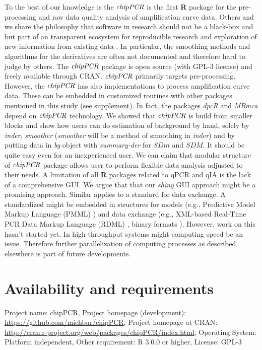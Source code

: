 \documentclass[twocolumn]{bmcart}%
\begin{document}
To the best of our knowledge is the $\emph{chipPCR}$ is the first \textbf{R} 
package for the pre-processing and raw data quality analysis of amplification 
curve data. Others and we share the philosophy that software in research should 
not be a black-box and but part of an transparent ecosystem for reproducible 
research and exploration of new information from existing data 
\cite{Thioulouse_2010, roediger_RJ_2013, hofmann_2013, Leeper_2014, liu_2014}. 
In particular, the smoothing methods and algorithms for the derivatives are 
often not documented and therefore hard to judge by others. The $\emph{chipPCR}$ 
package is open source (with GPL-3 license) and freely available through CRAN. 
$\emph{chipPCR}$ primarily targets pre-processing. However, the $\emph{chipPCR}$ 
has also implementations to process amplification curve data. These can be 
embedded in customized routines with other packages mentioned in this study 
(see supplement). In fact, the packages \emph{dpcR} and \emph{MBmca} depend on 
$\emph{chipPCR}$ technology. We showed that $\emph{chipPCR}$ is build from 
smaller blocks and show how users can do estimation of background by hand, 
solely by \textsl{inder}, \textsl{smoother} (\textsl{smoother} will be a method 
of smoothing in \textsl{inder}) and by putting data in \textsl{bg} object with 
\textsl{summary-der} for $SDm$ and $SDM$. It should be quite easy even for an 
inexperienced user. We can claim that modular structure of $\emph{chipPCR}$ 
package allows user to perform flexible data analysis adjusted to their needs. A 
limitation of all \textbf{R} packages related to qPCR and qIA is the lack of a 
comprehensive GUI. We argue that that our \emph{shiny} GUI approach might be a 
promising approach. Similar applies to a standard for data exchange. A 
standardized might be embedded in structures for models (e.g., Predictive Model 
Markup Language (PMML) \cite{Guazzelli_2009}) and data exchange (e.g., XML-based 
Real-Time PCR Data Markup Language (RDML) \cite{lefever_2009}, binary formats 
\cite{michna_2013}). However, work on this hasn't started yet. In 
high-throughput systems might computing speed be an issue. Therefore further 
parallelization of computing processes as described elsewhere 
\cite{Schmidberger_2009, boehringer_2013} is part of future developments. 

\section*{Availability and requirements}
Project name: chipPCR, 
Project homepage (development):
\url{https://github.com/michbur/chipPCR}, 
Project homepage at CRAN: 
\url{http://cran.r-project.org/web/packages/chipPCR/index.html}, 
Operating System: Platform independent, 
Other requirement: R 3.0.0 or higher, 
License: GPL-3
\end{document}
